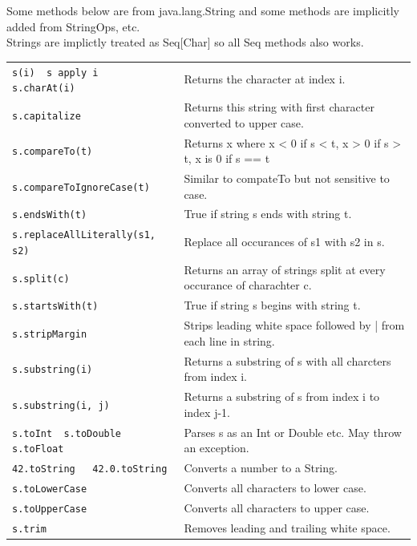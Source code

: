 \documentclass[article, a5paper]{memoir}
\newcommand{\LangColor}{red}
\newcommand{\head}[1]{{\bfseries {\color{\LangColor}{#1}}\par\vspace{1mm}\hrule\vspace{-2mm}}}
\renewcommand{\arraystretch}{0.9}
\newcommand{\code}{\lstinline[basicstyle=\ttfamily]}
\newcommand{\Newline}{\vspace{\baselineskip}}
\begin{document}
{\clearpage

\Newline\head{Strings}\Newline


{\small\renewcommand{\arraystretch}{1.15}

Some methods below are from java.lang.String and some methods are implicitly added from StringOps, etc.\\ Strings are implictly treated as Seq[Char] so all Seq methods also works.

\vspace{0.5em}

\begin{tabular}{@{}l l}
\code|s(i)  s apply i   s.charAt(i)| & Returns the character at index i. \\
\code|s.capitalize| & Returns this string with first character converted to upper case. \\
\code|s.compareTo(t)| & Returns x where x < 0 if s < t, x > 0 if s > t, x is 0 if s == t\\
\code|s.compareToIgnoreCase(t)| & Similar to compateTo but not sensitive to case.\\
\code|s.endsWith(t)| & True if string s ends with string t. \\
\code|s.replaceAllLiterally(s1, s2)| & Replace all occurances of s1 with s2 in s. \\
\code|s.split(c)| & Returns an array of strings split at every occurance of charachter c. \\
\code|s.startsWith(t)| & True if string s begins with string t. \\
\code|s.stripMargin| & Strips leading white space followed by | from each line in string.\\
\code|s.substring(i)| & Returns a substring of s with all charcters from index i.\\
\code|s.substring(i, j)| & Returns a substring of s from index i to index j-1.\\
\code|s.toInt  s.toDouble  s.toFloat| & Parses s as an Int or Double etc. May throw an exception.\\
\code|42.toString   42.0.toString| & Converts a number to a String.\\
\code|s.toLowerCase| & Converts all characters to lower case.\\
\code|s.toUpperCase| & Converts all characters to upper case. \\
\code|s.trim| & Removes leading and trailing white space.\\
\end{tabular}
} 



}
\end{document}
